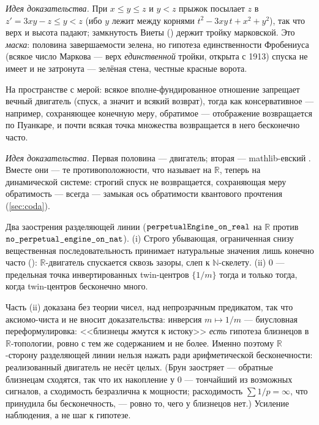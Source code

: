 \emph{Идея доказательства.} При $x \le y \le z$ и $y < z$ прыжок посылает $z$ в $z' = 3xy-z \le y < z$
(ибо $y$ лежит между корнями $t^2 - 3xy\,t + x^2 + y^2$), так что верх и высота падают; замкнутость
Виеты () держит тройку марковской. Это \emph{маска}: половина завершаемости зелена,
но гипотеза единственности Фробениуса (всякое число Маркова --- верх \emph{единственной} тройки, открыта
с 1913) спуска не имеет и не затронута --- зелёная стена, честные красные ворота.

\begin{theorem}\label{thm:poincare_dividing_line}
\green{} На пространстве с мерой: всякое вполне-фундированное отношение запрещает вечный двигатель
(спуск, а значит и всякий возврат), тогда как консервативное --- например, сохраняющее конечную меру,
обратимое --- отображение возвращается по Пуанкаре, и почти всякая точка множества возвращается в него
бесконечно часто.
\end{theorem}

\emph{Идея доказательства.} Первая половина --- двигатель; вторая --- mathlib-евский
. Вместе они --- те противоположности, что
 называет на $\mathbb{R}$, теперь на динамической системе: строгий
спуск не возвращается, сохраняющая меру обратимость --- всегда --- замыкая ось обратимости квантового
прочтения (\cref{sec:coda}).

\begin{theorem}\label{thm:reciprocal_dividing_line}
\green{} Два заострения разделяющей линии ($\texttt{perpetualEngine\_on\_real}$ на $\mathbb{R}$ против
$\texttt{no\_perpetual\_engine\_on\_nat}$). (i) Строго убывающая, ограниченная снизу вещественная
последовательность принимает натуральные значения лишь конечно часто
(): $\mathbb{R}$-двигатель спускается сквозь зазоры, слеп к
$\mathbb{N}$-скелету. (ii) $0$ --- предельная точка инвертированных twin-центров $\{1/m\}$ тогда и только
тогда, когда twin-центров бесконечно много.
\end{theorem}

\begin{remark}
Часть (ii) доказана без теории чисел, над непрозрачным предикатом, так что аксиомо-чиста и не вносит
доказательства: инверсия $m\mapsto 1/m$ --- биусловная переформулировка: <<близнецы жмутся к истоку>>
\emph{есть} гипотеза близнецов в $\mathbb{R}$-топологии, ровно с тем же содержанием и не более. Именно
поэтому $\mathbb{R}$-сторону разделяющей линии нельзя нажать ради арифметической бесконечности:
реализованный двигатель не несёт целых. (Брун заостряет --- обратные близнецам сходятся, так что их
накопление у $0$ --- тончайший из возможных сигналов, а сходимость безразлична к мощности; расходимость
$\sum 1/p = \infty$, что принудила бы бесконечность, --- ровно то, чего у близнецов нет.) Усиление
наблюдения, а не шаг к гипотезе.
\end{remark}

